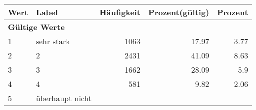      \begin{longtable}{lXrrr}
     \toprule
     \textbf{Wert} & \textbf{Label} & \textbf{Häufigkeit} & \textbf{Prozent(gültig)} & \textbf{Prozent} \\
     \endhead
     \midrule
     \multicolumn{5}{l}{\textbf{Gültige Werte}}\\

     1 &
     \multicolumn{1}{X}{ sehr stark   } &


       \num{1063} &
       \num[round-mode=places,round-precision=2]{17,97} &
         \num[round-mode=places,round-precision=2]{3,77} \\

     2 &
     \multicolumn{1}{X}{ 2   } &


       \num{2431} &
       \num[round-mode=places,round-precision=2]{41,09} &
         \num[round-mode=places,round-precision=2]{8,63} \\

     3 &
     \multicolumn{1}{X}{ 3   } &


       \num{1662} &
       \num[round-mode=places,round-precision=2]{28,09} &
         \num[round-mode=places,round-precision=2]{5,9} \\

     4 &
     \multicolumn{1}{X}{ 4   } &


       \num{581} &
       \num[round-mode=places,round-precision=2]{9,82} &
         \num[round-mode=places,round-precision=2]{2,06} \\

     5 &
     \multicolumn{1}{X}{ überhaupt nicht   } &



\end{longtable}
